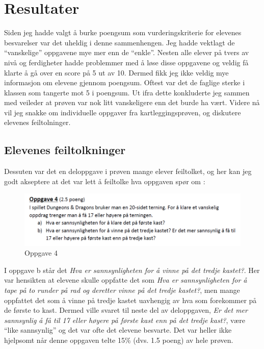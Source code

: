 \documentclass[main.tex]{subfiles}
\begin{document}
\section*{Resultater}
\label{sec:4}

Siden jeg hadde valgt å burke poengsum som vurderingskriterie for elevenes besvarelser var det 
uheldig i denne sammenhengen. Jeg hadde vektlagt de ``vanskelige'' oppgavene mye mer enn de 
``enkle''. Nesten alle elever på tvers av nivå og ferdigheter hadde 
problemmer med å løse disse oppgavene og veldig få klarte å gå over en score på 5 ut av 10. Dermed fikk jeg ikke 
veldig mye informasjon om elevene gjennom poengsum. Oftest var det de faglige sterke i klassen som tangerte
mot 5 i poengsum. Ut ifra dette konkluderte jeg sammen med veileder at prøven var nok litt vanskeligere enn
det burde ha vært. Videre nå vil jeg snakke om individuelle oppgaver fra kartleggingsprøven, og diskutere 
elevenes feiltolninger.

\subsection*{Elevenes feiltolkninger}
Dessuten var det en deloppgave i prøven mange elever feiltolket, og her kan jeg godt
akseptere at det var lett å feiltolke hva oppgaven spør om :
\par
\begin{figure}[h!]
\includegraphics[scale = 0.7]{../figures/oppgave4b.png}
\caption{Oppgave 4}
\end{figure}
I oppgave b står det \emph{Hva er sannsynligheten for å vinne på det tredje kastet?}. Her var hensikten at
elevene skulle oppfatte det som \emph{Hva er sannsynligheten for å tape på to runder på rad og deretter vinne på 
det tredje kastet?}, men mange oppfattet det som å vinne på tredje kastet uavhengig av hva som forekommer på de 
første to kast. Dermed ville svaret til neste del av deloppgaven, \emph{Er det mer sannsynlig å få til 17 eller 
høyere på første kast enn på det tredje kast?},  være ``like sannsynlig'' og det var ofte det elevene besvarte. 
Det var heller ikke hjelpsomt når denne oppgaven telte 15\% (dvs. 1.5 poeng) av hele prøven.  
\end{document}
